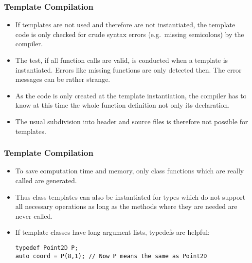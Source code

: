 \begin{frame}[fragile]
\frametitle{Template Compilation}
\begin{itemize}
\item If templates are not used and therefore are not instantiated, the template code is only
checked for crude syntax errors (e.g.~missing semicolons) by the compiler.
\item The test, if all function calls are valid, is conducted when a template is instantiated.
Errors like missing functions are only detected then. The error messages can be rather strange.
\item As the code is only created at the template instantiation, the compiler has to know at this
time the whole function definition not only its declaration.
\item The usual subdivision into header and source files is therefore not possible for templates.
\end{itemize}
\end{frame}


\begin{frame}[fragile]
\frametitle<presentation>{Template Compilation}
\begin{itemize}
\item To save computation time and memory, only class functions which are really called are generated.
\item Thus
class templates can also be instantiated for types which do not support all necessary operations as long
as the methods where they are needed are never called.
\item If template classes have long argument lists, typedefs are helpful:
\begin{lstlisting}
typedef Point2D P;
auto coord = P(8,1); // Now P means the same as Point2D
\end{lstlisting}

\end{itemize}
\end{frame}

